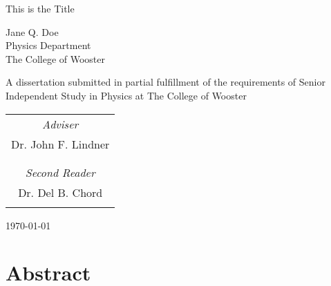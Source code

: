 \documentclass{book}
\begin{document}
\frontmatter

\begin{titlepage}
	\begin{center}

		\huge{This is the Title}

		\vspace{2.5cm}

		\LARGE{Jane Q. Doe}\\ 
		\LARGE{Physics Department}\\
		\LARGE{The College of Wooster}\\
		
		\vspace{0.5cm}
		
		\large A dissertation submitted in partial fulfillment 
		of the requirements of  Senior Independent Study in Physics at The College of Wooster\\
		
		\vspace{2.5cm}
		
		\begin{table}[h!]
			\begin{center}
				\begin{tabular}{c}
				
					\large{\emph{Adviser}}\\
					\large{Dr. John F. Lindner}\\
					\vspace{0.5cm}\\
					\hline
					
					\vspace{1.0cm}\\
					\large{\emph{Second Reader}}\\
					\large{Dr. Del B. Chord}\\
					\vspace{0.5cm}\\
					\hline
					
				\end{tabular}
			\end{center}
		\end{table}
		
		\vspace{2.5cm}

		\large{\today}

	\end{center}
\end{titlepage}

\chapter*{Abstract}
\end{document}
